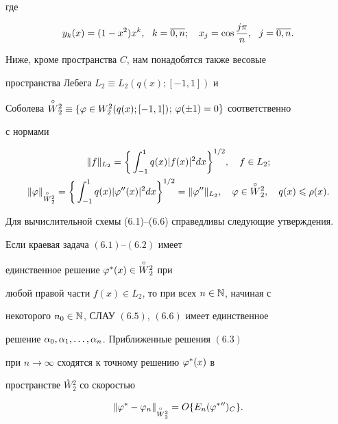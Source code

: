 где


\begin{equation}


y_k(x)=(1-x^2)x^k,\ \  k=\ol{0,n};\quad x_j=\cos \frac{j\pi}{n},\ \


j=\ol{0,n}.


\end{equation}





Ниже, кроме пространства $C$, нам понадобятся также весовые


пространства Лебега $L_2\equiv L_2(q(x);[-1,1])$ и


Соболева $\overset{\circ}{W}{}_2^2\equiv \{\vp\in


W_2^2(q(x);[-1,1])$; $\vp(\pm 1)=0\}$ соответственно


с нормами


\begin{gather*}


\|f\|_{L_2}=\bigg\{\int_{-1}^{1}q(x)|f(x)|^2dx\bigg\}^{1/2}, 


\quad f\in L_2;\\


%


\|\vp\|_{\overset{\circ}{W}{}_2^2}=\bigg\{\int_{-1}^{1}q(x)


|\vp''(x)|^2dx\bigg\}^{1/2}=


\|\vp''\|_{L_2}, \quad \vp\in \overset{\circ}{W}{}_2^2,


\quad q(x)\lea \rho(x).


\end{gather*}





Для вычислительной схемы (6.1)--(6.6) справедливы следующие утверждения.








\begin{thm}


Если краевая задача $(6.1)$--$(6.2)$ имеет


единственное решение $\varphi^*(x)\in \overset{\circ}{W}{}_2^2$ при


любой правой части $f(x)\in L_2$, то при всех $n\in \Bbb{N}$, начиная с


некоторого $n_0\in \Bbb{N}$, СЛАУ $(6.5)$, $(6.6)$ имеет единственное


решение $\alpha_0,\alpha_1,\dotsc,\alpha_n$. Приближенные решения $(6.3)$


при $n\rightarrow \infty$ сходятся к точному решению $\varphi^*(x)$ в


пространстве $\overset{\circ}{W}{}_2^2$ со скоростью


$$


\|\vp^*-\vp_n\|_{\overset{\circ}{W}{}_2^2}=O\{E_n(\vp^*{}'')_C\}.


$$


\end{thm}








